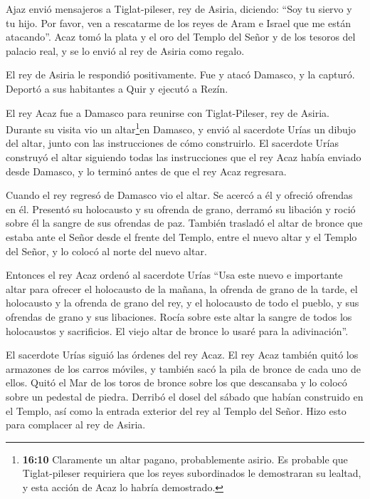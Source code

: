  Ajaz envió mensajeros a Tiglat-pileser, rey de Asiria,
diciendo: ``Soy tu siervo y tu hijo. Por favor, ven a rescatarme de los
reyes de Aram e Israel que me están atacando''.  Acaz tomó
la plata y el oro del Templo del Señor y de los tesoros del palacio
real, y se lo envió al rey de Asiria como regalo.

 El rey de Asiria le respondió positivamente. Fue y atacó
Damasco, y la capturó. Deportó a sus habitantes a Quir y ejecutó a
Rezín.

 El rey Acaz fue a Damasco para reunirse con
Tiglat-Pileser, rey de Asiria. Durante su visita vio un
altar\footnote{\textbf{16:10} Claramente un altar pagano, probablemente
  asirio. Es probable que Tiglat-pileser requiriera que los reyes
  subordinados le demostraran su lealtad, y esta acción de Acaz lo
  habría demostrado.}en Damasco, y envió al sacerdote Urías un dibujo
del altar, junto con las instrucciones de cómo construirlo.
 El sacerdote Urías construyó el altar siguiendo todas las
instrucciones que el rey Acaz había enviado desde Damasco, y lo terminó
antes de que el rey Acaz regresara.

 Cuando el rey regresó de Damasco vio el altar. Se acercó a
él y ofreció ofrendas en él.  Presentó su holocausto y su
ofrenda de grano, derramó su libación y roció sobre él la sangre de sus
ofrendas de paz.  También trasladó el altar de bronce que
estaba ante el Señor desde el frente del Templo, entre el nuevo altar y
el Templo del Señor, y lo colocó al norte del nuevo altar.

 Entonces el rey Acaz ordenó al sacerdote Urías ``Usa este
nuevo e importante altar para ofrecer el holocausto de la mañana, la
ofrenda de grano de la tarde, el holocausto y la ofrenda de grano del
rey, y el holocausto de todo el pueblo, y sus ofrendas de grano y sus
libaciones. Rocía sobre este altar la sangre de todos los holocaustos y
sacrificios. El viejo altar de bronce lo usaré para la adivinación''.

 El sacerdote Urías siguió las órdenes del rey Acaz.
 El rey Acaz también quitó los armazones de los carros
móviles, y también sacó la pila de bronce de cada uno de ellos. Quitó el
Mar de los toros de bronce sobre los que descansaba y lo colocó sobre un
pedestal de piedra.  Derribó el dosel del sábado que habían
construido en el Templo, así como la entrada exterior del rey al Templo
del Señor. Hizo esto para complacer al rey de Asiria.

